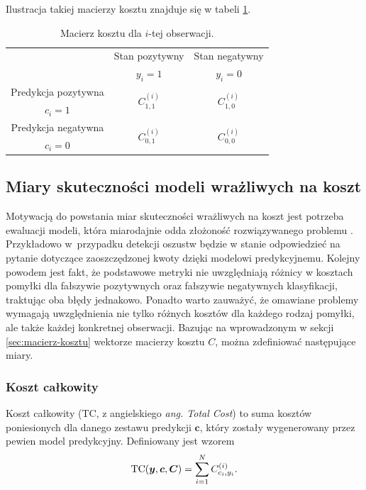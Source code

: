 \documentclass[inzynierska]{pwr_wmat_praca_dyplomowa}
\theoremstyle{plain}
\numberwithin{theorem}{chapter}
\theoremstyle{definition}
\numberwithin{theorem}{chapter}
\begin{document}
Ilustracja takiej macierzy kosztu znajduje się w tabeli \ref{tab:macierz-kosztu}.
\begin{table}[h]
	\begin{center}
		\begin{tabular}{c|c|c}
			\multirow{2}{4em}{} & Stan pozytywny & Stan negatywny \\
			& $y_i = 1$            & $y_i = 0$ \\
			\hline
			Predykcja pozytywna & \multirow{2}{4em}{\centering $C^{(i)}_{1,1}$} & \multirow{2}{4em}{\centering $C^{(i)}_{1,0}$} \\
			$c_i = 1$         &                    &                    \\
			\hline
			Predykcja negatywna & \multirow{2}{4em}{\centering $C^{(i)}_{0,1}$} & \multirow{2}{4em}{\centering $C^{(i)}_{0,0}$} \\
			$c_i = 0$         &                    &                    \\
		\end{tabular}
	\end{center}
	\caption{Macierz kosztu dla $i$-tej obserwacji.}
	\label{tab:macierz-kosztu}
\end{table}

\subsection{Miary skuteczności modeli wrażliwych na koszt}
Motywacją do powstania miar skuteczności wrażliwych na koszt jest potrzeba ewaluacji modeli, która miarodajnie odda złożoność rozwiązywanego problemu \cite{EDCSLR}. Przykładowo w~przypadku detekcji oszustw będzie w stanie odpowiedzieć na pytanie dotyczące zaoszczędzonej kwoty dzięki modelowi predykcyjnemu. Kolejny powodem jest fakt, że podstawowe metryki nie uwzględniają różnicy w kosztach pomyłki dla fałszywie pozytywnych oraz fałszywie negatywnych klasyfikacji, traktując oba błędy jednakowo. Ponadto warto zauważyć, że omawiane problemy wymagają uwzględnienia nie tylko różnych kosztów dla każdego rodzaj pomyłki, ale także każdej konkretnej obserwacji. Bazując na wprowadzonym w sekcji \ref{sec:macierz-kosztu} wektorze macierzy kosztu $C$, można zdefiniować następujące miary.

\subsubsection{Koszt całkowity}
Koszt całkowity (TC, z angielskiego \textit{ang. Total Cost}) to suma kosztów poniesionych dla danego zestawu predykcji $\boldsymbol{c}$, który zostały wygenerowany przez pewien model predykcyjny. Definiowany jest wzorem
\begin{equation}
	\label{koszt-calkowity}
	\text{TC}(\boldsymbol{y}, \boldsymbol{c}, \boldsymbol{C}) = \sum_{i=1}^N C^{(i)}_{c_i,y_i} \text{.}
\end{equation} 
\end{document}

